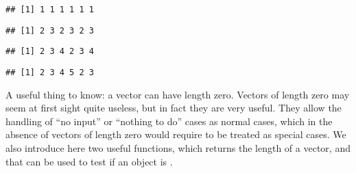\documentclass[paper=a4,headsepline,BCOR=12mm,twoside,open=right,%
titlepage,headings=small,fontsize=10pt,index=totoc,bibliography=totoc,%
captions=tableheading,captions=nooneline]{scrbook}\usepackage{knitr}
\begin{document}
\begin{knitrout}\footnotesize
{}\color{fgcolor}\begin{kframe}
\begin{alltt}
 \hlkwb{<-} \hlstd{(}\hlstd{,} \hlstd{)}
\end{alltt}
\begin{verbatim}
## [1] 1 1 1 1 1 1
\end{verbatim}
\begin{alltt}
 \hlopt{+} \hlopt{:}
\end{alltt}
\begin{verbatim}
## [1] 2 3 2 3 2 3
\end{verbatim}
\begin{alltt}
 \hlopt{+} \hlopt{:}
\end{alltt}
\begin{verbatim}
## [1] 2 3 4 2 3 4
\end{verbatim}
\begin{alltt}
 \hlopt{+} \hlopt{:}
\end{alltt}


{\ttfamily\noindent\color{warningcolor}{\#\# Warning in a + 1:4: longer object length is not a multiple of shorter object length}}\begin{verbatim}
## [1] 2 3 4 5 2 3
\end{verbatim}
\end{kframe}
\end{knitrout}

A useful thing to know: a vector can have length zero. Vectors of length zero may seem at first sight quite useless, but in fact they are very useful. They allow the handling of ``no input'' or ``nothing to do'' cases as normal cases, which in the absence of vectors of length zero would require to be treated as special cases. We also introduce here two useful functions,  which returns the length of a vector, and  that can be used to test if an \R object is .
\end{document}
